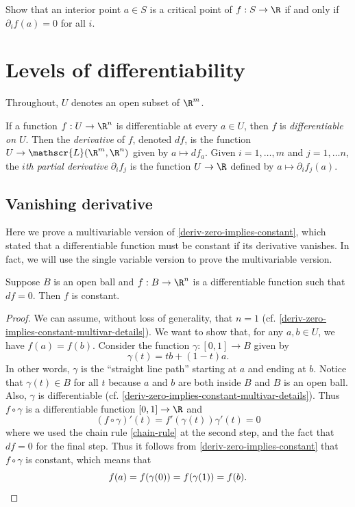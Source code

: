\begin{exercise}
	Show that an interior point $a \in S$ is a critical point of $f : S \to \R$ if and only if $\partial_i f(a) = 0$ for all $i$. 
\end{exercise}

\section{Levels of differentiability}

Throughout, $U$ denotes an open subset of $\R^m$. 

\begin{definition}[Differentiability]
	If a function $f : U \to \R^n$ is differentiable at every $a \in U$, then $f$ is \emph{differentiable on $U$}. Then the \emph{derivative} of $f$, denoted $df$, is the function $U \to \mathscr{L}(\R^m, \R^n)$ given by $a \mapsto df_a$. Given $i = 1, \dotsc, m$ and $j = 1, \dotsc n$, the \emph{$i$th partial derivative} $\partial_i f_j$ is the function $U \to \R$ defined by $a \mapsto \partial_i f_j(a)$. 
\end{definition}

\subsection{Vanishing derivative}

Here we prove a multivariable version of \cref{deriv-zero-implies-constant}, which stated that a differentiable function must be constant if its derivative vanishes. In fact, we will use the single variable version to prove the multivariable version. 

\begin{proposition} \label{deriv-zero-implies-constant-multivar}
	Suppose $B$ is an open ball and $f : B \to \R^n$ is a differentiable function such that $df = 0$. Then $f$ is constant.  
\end{proposition}

\begin{proof}
	We can assume, without loss of generality, that $n = 1$ (cf. \cref{deriv-zero-implies-constant-multivar-details}). We want to show that, for any $a,  b \in U$, we have $f(a) = f(b)$. Consider the function $\gamma : [0,1] \to B$ given by
	\[ \gamma(t) = tb + (1-t)a.  \]
	In other words, $\gamma$ is the ``straight line path'' starting at $a$ and ending at $b$. Notice that $\gamma(t) \in B$ for all $t$ because $a$ and $b$ are both inside $B$ and $B$ is an open ball. Also, $\gamma$ is differentiable (cf. \cref{deriv-zero-implies-constant-multivar-details}). Thus $f \circ \gamma$ is a differentiable function $[0,1] \to \R$ and 
	\[ (f \circ \gamma)'(t) = f'(\gamma(t)) \gamma'(t) = 0 \]
	where we used the chain rule \ref{chain-rule} at the second step, and the fact that $df = 0$ for the final step. Thus it follows from \cref{deriv-zero-implies-constant} that $f \circ \gamma$ is constant, which means that
	\[ f(a) = f(\gamma(0)) = f(\gamma(1)) = f(b). \qedhere \]
\end{proof}

